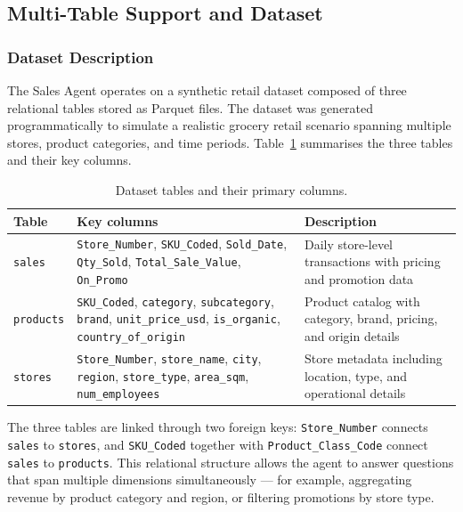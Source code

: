 \documentclass[11pt,a4paper]{article}
\begin{document}
\subsection{Multi-Table Support and Dataset}
\label{subsec:multitable}

\subsubsection{Dataset Description}

The Sales Agent operates on a synthetic retail dataset composed of three relational
tables stored as Parquet files. The dataset was generated programmatically to
simulate a realistic grocery retail scenario spanning multiple stores, product
categories, and time periods. Table~\ref{tab:dataset} summarises the three tables
and their key columns.

\begin{table}[h]
\centering
\begin{tabular}{|l|l|p{6.5cm}|}
\hline
\rowcolor{bluePoli!30}
\textbf{Table} & \textbf{Key columns} & \textbf{Description} \T\B \\
\hline
\texttt{sales} &
  \texttt{Store\_Number}, \texttt{SKU\_Coded}, \texttt{Sold\_Date},
  \texttt{Qty\_Sold}, \texttt{Total\_Sale\_Value}, \texttt{On\_Promo} &
  Daily store-level transactions with pricing and promotion data \T\B \\
\hline
\texttt{products} &
  \texttt{SKU\_Coded}, \texttt{category}, \texttt{subcategory},
  \texttt{brand}, \texttt{unit\_price\_usd}, \texttt{is\_organic},
  \texttt{country\_of\_origin} &
  Product catalog with category, brand, pricing, and origin details \T\B \\
\hline
\texttt{stores} &
  \texttt{Store\_Number}, \texttt{store\_name}, \texttt{city},
  \texttt{region}, \texttt{store\_type}, \texttt{area\_sqm},
  \texttt{num\_employees} &
  Store metadata including location, type, and operational details \T\B \\
\hline
\end{tabular}
\caption{Dataset tables and their primary columns.}
\label{tab:dataset}
\end{table}

The three tables are linked through two foreign keys: \texttt{Store\_Number}
connects \texttt{sales} to \texttt{stores}, and \texttt{SKU\_Coded} together with
\texttt{Product\_Class\_Code} connect \texttt{sales} to \texttt{products}. This
relational structure allows the agent to answer questions that span multiple
dimensions simultaneously — for example, aggregating revenue by product category
and region, or filtering promotions by store type.
\end{document}
